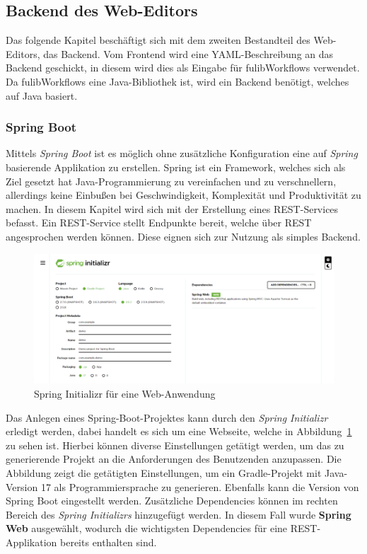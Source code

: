 \subsection{Backend des Web-Editors}\label{subsec:backend}
Das folgende Kapitel beschäftigt sich mit dem zweiten Bestandteil des Web-Editors, das Backend.
Vom Frontend wird eine YAML-Beschreibung an das Backend geschickt, in diesem wird dies als Eingabe für fulibWorkflows verwendet.
Da fulibWorkflows eine Java-Bibliothek ist, wird ein Backend benötigt, welches auf Java basiert.

\subsubsection{Spring Boot}
Mittels \textit{Spring Boot} ist es möglich ohne zusätzliche Konfiguration eine auf \textit{Spring} basierende Applikation zu erstellen\cite*{springBoot}.
Spring ist ein Framework, welches sich als Ziel gesetzt hat Java-Programmierung zu vereinfachen und zu verschnellern, allerdings keine Einbußen
bei Geschwindigkeit, Komplexität und Produktivität zu machen\cite*{spring}.
In diesem Kapitel wird sich mit der Erstellung eines REST-Services befasst.
Ein REST-Service stellt Endpunkte bereit, welche über REST angesprochen werden können.
Diese eignen sich zur Nutzung als simples Backend.

\begin{figure}[h]
    \centering
    \includegraphics[width=1.0\textwidth]{images/2.2/spring-init}
    \caption{Spring Initializr für eine Web-Anwendung}
    \label{fig:spring-init}
\end{figure}


Das Anlegen eines Spring-Boot-Projektes kann durch den \textit{Spring Initializr} erledigt werden, dabei handelt es sich um eine Webseite, welche in
Abbildung~\ref{fig:spring-init} zu sehen ist\cite*{sbinit}.
Hierbei können diverse Einstellungen getätigt werden, um das zu generierende Projekt an die Anforderungen des Benutzenden anzupassen.
Die Abbildung zeigt die getätigten Einstellungen, um ein Gradle-Projekt mit Java-Version 17 als Programmiersprache zu generieren.
Ebenfalls kann die Version von Spring Boot eingestellt werden.
Zusätzliche Dependencies können im rechten Bereich des \textit{Spring Initializrs} hinzugefügt werden.
In diesem Fall wurde \textbf{Spring Web} ausgewählt, wodurch die wichtigsten Dependencies für eine REST-Applikation bereits enthalten sind.

